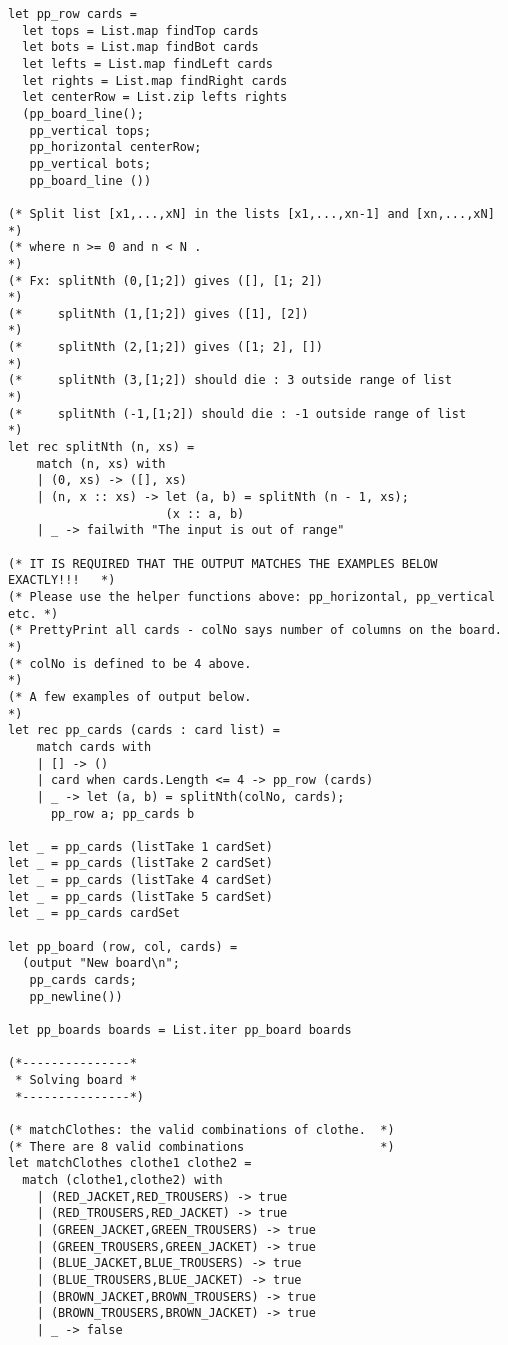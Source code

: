 \begin{lstlisting}
let pp_row cards =
  let tops = List.map findTop cards
  let bots = List.map findBot cards
  let lefts = List.map findLeft cards
  let rights = List.map findRight cards
  let centerRow = List.zip lefts rights
  (pp_board_line();
   pp_vertical tops;
   pp_horizontal centerRow;
   pp_vertical bots;
   pp_board_line ())

(* Split list [x1,...,xN] in the lists [x1,...,xn-1] and [xn,...,xN] *)
(* where n >= 0 and n < N .                                          *)
(* Fx: splitNth (0,[1;2]) gives ([], [1; 2])                         *)
(*     splitNth (1,[1;2]) gives ([1], [2])                           *)
(*     splitNth (2,[1;2]) gives ([1; 2], [])                         *)
(*     splitNth (3,[1;2]) should die : 3 outside range of list       *)
(*     splitNth (-1,[1;2]) should die : -1 outside range of list     *)
let rec splitNth (n, xs) = 
    match (n, xs) with
    | (0, xs) -> ([], xs)
    | (n, x :: xs) -> let (a, b) = splitNth (n - 1, xs);
                      (x :: a, b)
    | _ -> failwith "The input is out of range"

(* IT IS REQUIRED THAT THE OUTPUT MATCHES THE EXAMPLES BELOW EXACTLY!!!   *)
(* Please use the helper functions above: pp_horizontal, pp_vertical etc. *)
(* PrettyPrint all cards - colNo says number of columns on the board.     *)
(* colNo is defined to be 4 above.                                        *)
(* A few examples of output below.                                        *)
let rec pp_cards (cards : card list) = 
    match cards with
    | [] -> ()
    | card when cards.Length <= 4 -> pp_row (cards)
    | _ -> let (a, b) = splitNth(colNo, cards);
      pp_row a; pp_cards b
 
let _ = pp_cards (listTake 1 cardSet)
let _ = pp_cards (listTake 2 cardSet)
let _ = pp_cards (listTake 4 cardSet)
let _ = pp_cards (listTake 5 cardSet)
let _ = pp_cards cardSet

let pp_board (row, col, cards) =
  (output "New board\n";
   pp_cards cards;
   pp_newline())

let pp_boards boards = List.iter pp_board boards

(*---------------*
 * Solving board *
 *---------------*)

(* matchClothes: the valid combinations of clothe.  *)
(* There are 8 valid combinations                   *)
let matchClothes clothe1 clothe2 =
  match (clothe1,clothe2) with
    | (RED_JACKET,RED_TROUSERS) -> true
    | (RED_TROUSERS,RED_JACKET) -> true
    | (GREEN_JACKET,GREEN_TROUSERS) -> true
    | (GREEN_TROUSERS,GREEN_JACKET) -> true
    | (BLUE_JACKET,BLUE_TROUSERS) -> true
    | (BLUE_TROUSERS,BLUE_JACKET) -> true
    | (BROWN_JACKET,BROWN_TROUSERS) -> true
    | (BROWN_TROUSERS,BROWN_JACKET) -> true
    | _ -> false


\end{lstlisting}
